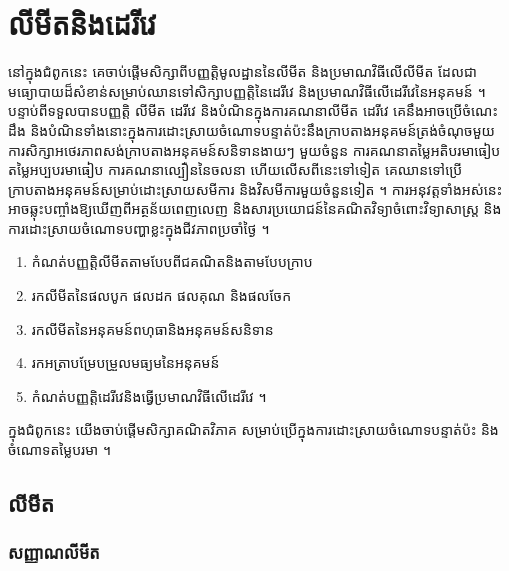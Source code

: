 \chapter{លីមីតនិងដេរីវេ}

\begin{note}[ជំពូកទី ៥ ៖ លីមីតនិងដេរីវេ]
នៅក្នុងជំពូកនេះ គេចាប់ផ្ដើមសិក្សាពីបញ្ញត្តិមូលដ្ឋាននៃលីមីត និងប្រមាណវិធីលើលីមីត ដែលជាមធ្យោបាយដ៏សំខាន់សម្រាប់ឈានទៅសិក្សាបញ្ញត្តិនៃដេរីវេ និងប្រមាណវិធីលើដេរីវេនៃអនុគមន៍ ។ បន្ទាប់ពីទទួលបានបញ្ញត្តិ លីមីត ដេរីវេ និងបំណិនក្នុងការគណនាលីមីត ដេរីវេ គេនឹងអាចប្រើចំណេះដឹង និងបំណិនទាំងនោះក្នុងការដោះស្រាយចំណោទបន្ទាត់ប៉ះនឹងក្រាបតាងអនុគមន៍ត្រង់ចំណុចមួយ ការសិក្សាអថេរភាពសង់ក្រាបតាងអនុគមន៍សនិទានងាយៗ មួយចំនួន ការគណនាតម្លៃអតិបរមាធៀប តម្លៃអប្បបរមាធៀប ការគណនាល្បឿននៃចលនា ហើយលើសពីនេះទៅទៀត គេឈានទៅប្រើក្រាបតាងអនុគមន៍សម្រាប់ដោះស្រាយសមីការ និងវិសមីការមួយចំនួនទៀត ។ ការអនុវត្តទាំងអស់នេះ អាចឆ្លុះបញ្ចាំងឱ្យឃើញពីអត្ថន័យពេញលេញ និងសារប្រយោជន៍នៃគណិតវិទ្យាចំពោះវិទ្យាសាស្ត្រ និងការដោះស្រាយចំណោទបញ្ហាខ្លះក្នុងជីវភាពប្រចាំថ្ងៃ ។
\end{note}

\begin{objBox}[វត្ថុបំណង]
\begin{enumerate}[1]
  \item កំណត់បញ្ញត្តិលីមីតតាមបែបពីជគណិតនិងតាមបែបក្រាប
  \item រកលីមីតនៃផលបូក ផលដក ផលគុណ និងផលចែក
  \item រកលីមីតនៃអនុគមន៍ពហុធានិងអនុគមន៍សនិទាន
  \item រកអត្រាបម្រែបម្រួលមធ្យមនៃអនុគមន៍
  \item កំណត់បញ្ញត្តិដេរីវេនិងធ្វើប្រមាណវិធីលើដេរីវេ ។
\end{enumerate}
\end{objBox}

ក្នុងជំពូកនេះ យើងចាប់ផ្ដើមសិក្សាគណិតវិភាគ សម្រាប់ប្រើក្នុងការដោះស្រាយចំណោទបន្ទាត់ប៉ះ និងចំណោទតម្លៃបរមា ។

\section{លីមីត}
\subsection{សញ្ញាណលីមីត}

